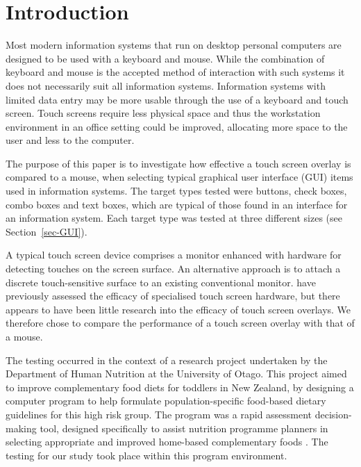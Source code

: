 \documentclass{elsart}
\begin{document}
\newcommand{\ISOnine}{ISO 9241-9}


\section{Introduction}
\label{sec-introduction}

Most modern information systems that run on desktop personal computers
are designed to be used with a keyboard and mouse. While the combination
of keyboard and mouse is the accepted method of interaction with such
systems it does not necessarily suit all information systems.
Information systems with limited data entry may be more usable through
the use of a keyboard and touch screen. Touch screens require less
physical space and thus the workstation environment in an office setting
could be improved, allocating more space to the user and less to the
computer.

The purpose of this paper is to investigate how effective a touch screen
overlay is compared to a mouse, when selecting typical graphical user
interface (GUI) items used in information systems. The target types
tested were buttons, check boxes, combo boxes and text boxes, which are
typical of those found in an interface for an information system. Each
target type was tested at three different sizes (see
Section~\ref{sec-GUI}).

A typical touch screen device comprises a monitor enhanced with hardware
for detecting touches on the screen surface. An alternative approach is
to attach a discrete touch-sensitive surface to an existing conventional
monitor. \citet{Sear-A-1991-IJMMS} have previously assessed the efficacy
of specialised touch screen hardware, but there appears to have been
little research into the efficacy of touch screen overlays. We therefore
chose to compare the performance of a touch screen overlay with that of
a mouse.

The testing occurred in the context of a research project undertaken by
the Department of Human Nutrition at the University of Otago. This
project aimed to improve complementary food diets for toddlers in New
Zealand, by designing a computer program to help formulate
population-specific food-based dietary guidelines for this high risk
group. The program was a rapid assessment decision-making tool, designed
specifically to assist nutrition programme planners in selecting
appropriate and improved home-based complementary foods
\citep{Ferg-E-2004}. The testing for our study took place within this
program environment.
\end{document}
